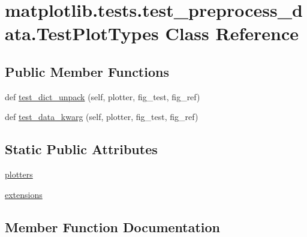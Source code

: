 \hypertarget{classmatplotlib_1_1tests_1_1test__preprocess__data_1_1TestPlotTypes}{}\section{matplotlib.\+tests.\+test\+\_\+preprocess\+\_\+data.\+Test\+Plot\+Types Class Reference}
\label{classmatplotlib_1_1tests_1_1test__preprocess__data_1_1TestPlotTypes}
\subsection*{Public Member Functions}
\begin{DoxyCompactItemize}
\item 
def \hyperlink{classmatplotlib_1_1tests_1_1test__preprocess__data_1_1TestPlotTypes_a790b2ea4992462bbe560bd14a7ff9458}{test\+\_\+dict\+\_\+unpack} (self, plotter, fig\+\_\+test, fig\+\_\+ref)
\item 
def \hyperlink{classmatplotlib_1_1tests_1_1test__preprocess__data_1_1TestPlotTypes_a19b1214500b3d61a898b46c8abb07c78}{test\+\_\+data\+\_\+kwarg} (self, plotter, fig\+\_\+test, fig\+\_\+ref)
\end{DoxyCompactItemize}
\subsection*{Static Public Attributes}
\begin{DoxyCompactItemize}
\item 
\hyperlink{classmatplotlib_1_1tests_1_1test__preprocess__data_1_1TestPlotTypes_a95ee992505b79e7ee8ef9335edafc02b}{plotters}
\item 
\hyperlink{classmatplotlib_1_1tests_1_1test__preprocess__data_1_1TestPlotTypes_a29befb51c817094a993e7ce3a1a17078}{extensions}
\end{DoxyCompactItemize}


\subsection{Member Function Documentation}
\mbox{\label{classmatplotlib_1_1tests_1_1test__preprocess__data_1_1TestPlotTypes_a19b1214500b3d61a898b46c8abb07c78}} 
